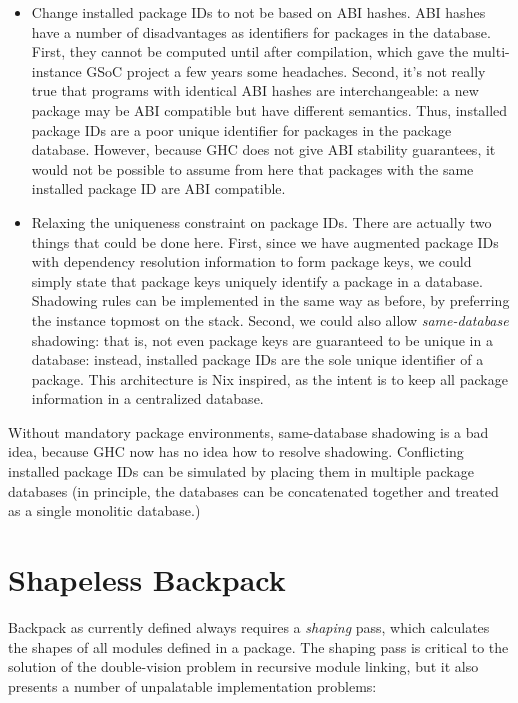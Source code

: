 \documentclass{article}
\begin{document}
\begin{itemize}
    \item Change installed package IDs to not be based on ABI hashes.
        ABI hashes have a number of disadvantages as identifiers for
        packages in the database.  First, they cannot be computed until
        after compilation, which gave the multi-instance GSoC project a
        few years some headaches.  Second, it's not really true that
        programs with identical ABI hashes are interchangeable: a new
        package may be ABI compatible but have different semantics.
        Thus, installed package IDs are a poor unique identifier for
        packages in the package database.  However, because GHC does not
        give ABI stability guarantees, it would not be possible to
        assume from here that packages with the same installed package
        ID are ABI compatible.

    \item Relaxing the uniqueness constraint on package IDs.  There are
        actually two things that could be done here.  First, since we
        have augmented package IDs with dependency resolution
        information to form package keys, we could simply state that
        package keys uniquely identify a package in a database.
        Shadowing rules can be implemented in the same way as before, by
        preferring the instance topmost on the stack.  Second, we could
        also allow \emph{same-database} shadowing: that is, not even
        package keys are guaranteed to be unique in a database: instead,
        installed package IDs are the sole unique identifier of a
        package.  This architecture is Nix inspired, as the intent is
        to keep all package information in a centralized database.
\end{itemize}

Without mandatory package environments, same-database shadowing is a bad
idea, because GHC now has no idea how to resolve shadowing.  Conflicting
installed package IDs can be simulated by placing them in multiple
package databases (in principle, the databases can be concatenated together
and treated as a single monolitic database.)

\section{Shapeless Backpack}\label{sec:simplifying-backpack}

Backpack as currently defined always requires a \emph{shaping} pass,
which calculates the shapes of all modules defined in a package.
The shaping pass is critical to the solution of the double-vision problem
in recursive module linking, but it also presents a number of unpalatable
implementation problems:
\end{document}
